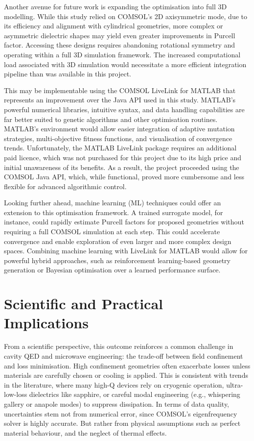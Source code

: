 Another avenue for future work is expanding the optimisation into full 3D
modelling. While this study relied on COMSOL’s 2D axisymmetric mode, due to its
efficiency and alignment with cylindrical geometries, more complex or asymmetric
dielectric shapes may yield even greater improvements in Purcell factor.
Accessing these designs requires abandoning rotational symmetry and operating
within a full 3D simulation framework. The increased computational load
associated with 3D simulation would necessitate a more efficient integration
pipeline than was available in this project.

This may be implementable using the COMSOL LiveLink\texttrademark{} for
MATLAB\textregistered{} that represents an improvement over the Java API used in
this study. MATLAB\textregistered{}’s powerful numerical libraries, intuitive
syntax, and data handling capabilities are far better suited to genetic
algorithms and other optimisation routines. MATLAB\textregistered{}’s
environment would allow easier integration of adaptive mutation strategies,
multi-objective fitness functions, and visualisation of convergence trends.
Unfortunately, the MATLAB\textregistered{} LiveLink\texttrademark{} package
requires an additional paid licence, which was not purchased for this project
due to its high price and initial unawareness of its benefits. As a result, the
project proceeded using the COMSOL Java API, which, while functional, proved
more cumbersome and less flexible for advanced algorithmic control.

Looking further ahead, machine learning (ML) techniques could offer an extension
to this optimisation framework. A trained surrogate model, for instance, could
rapidly estimate Purcell factors for proposed geometries without requiring a
full COMSOL simulation at each step. This could accelerate convergence and
enable exploration of even larger and more complex design spaces. Combining
machine learning with LiveLink\texttrademark{} for MATLAB\textregistered{} would
allow for powerful hybrid approaches, such as reinforcement learning-based
geometry generation or Bayesian optimisation over a learned performance surface.

\section{Scientific and Practical Implications}
\label{sec:section20}
From a scientific perspective, this outcome reinforces a common challenge in
cavity QED and microwave engineering: the trade-off between field confinement
and loss minimisation. High confinement geometries often exacerbate losses
unless materials are carefully chosen or cooling is applied. This is consistent
with trends in the literature, where many high-Q devices rely on cryogenic
operation, ultra-low-loss dielectrics like sapphire, or careful modal
engineering (e.g., whispering gallery or anapole modes) to suppress
dissipation\autocite{fedotov2007anapole}. In terms of data quality,
uncertainties stem not from numerical error, since COMSOL’s eigenfrequency
solver is highly accurate. But rather from physical assumptions such as perfect
material behaviour, and the neglect of thermal effects.

